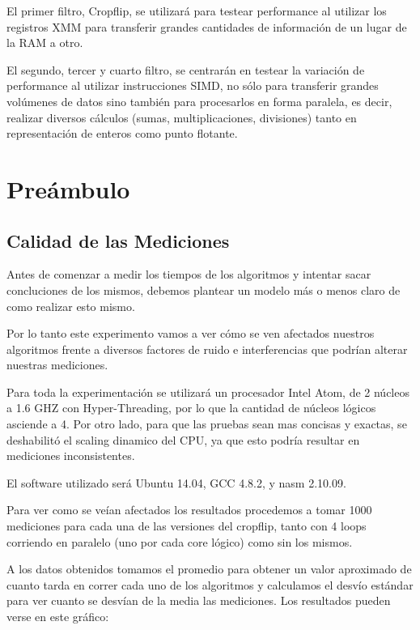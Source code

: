 \documentclass[a4paper]{article}
\begin{document}
El primer filtro, Cropflip, se utilizará para testear performance al utilizar los registros XMM para transferir grandes cantidades de información de un lugar de la RAM a otro.

El segundo, tercer y cuarto filtro, se centrarán en testear la variación de performance al utilizar instrucciones SIMD, no sólo para transferir grandes volúmenes de datos sino también para procesarlos en forma paralela, es decir, realizar diversos cálculos (sumas, multiplicaciones, divisiones) tanto en representación de enteros como punto flotante.

\newpage
\section{Preámbulo}

\subsection{Calidad de las Mediciones}

Antes de comenzar a medir los tiempos de los algoritmos y intentar sacar concluciones de los mismos, debemos plantear un modelo más o menos claro de como realizar esto mismo.  

Por lo tanto este experimento vamos a ver cómo se ven afectados nuestros algoritmos frente a diversos factores de ruido e interferencias que podrían alterar nuestras mediciones.

Para toda la experimentación se utilizará un procesador Intel Atom, de 2 núcleos a 1.6 GHZ con Hyper-Threading, por lo que la cantidad de núcleos lógicos asciende a 4. Por otro lado, para que las pruebas sean mas concisas y exactas, se deshabilitó el scaling dinamico del CPU, ya que esto podría resultar en mediciones inconsistentes. 

El software utilizado será Ubuntu 14.04, GCC 4.8.2, y nasm 2.10.09.

Para ver como se veían afectados los resultados procedemos a tomar 1000 mediciones para cada una de las versiones del cropflip, tanto con 4 loops corriendo en paralelo (uno por cada core lógico) como sin los mismos.

A los datos obtenidos tomamos el promedio para obtener un valor aproximado de cuanto tarda en correr cada uno de los algoritmos y calculamos el desvío estándar para ver cuanto se desvían de la media las mediciones. Los resultados pueden verse en este gráfico:
\end{document}

